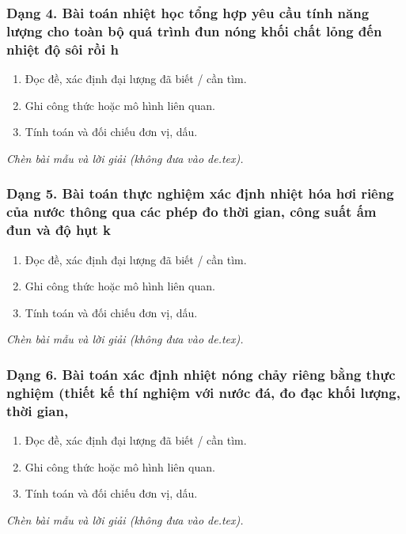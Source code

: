 \subsubsection{Dạng 4. Bài toán nhiệt học tổng hợp yêu cầu tính năng lượng cho toàn bộ quá trình đun nóng khối chất lỏng đến nhiệt độ sôi rồi h}
\begin{phuongphap}
\begin{enumerate}
\item Đọc đề, xác định đại lượng đã biết / cần tìm.
\item Ghi công thức hoặc mô hình liên quan.
\item Tính toán và đối chiếu đơn vị, dấu.
\end{enumerate}
\end{phuongphap}
\begin{vidumau}
\textit{Chèn bài mẫu và lời giải (không đưa vào de.tex).}
\end{vidumau}

\subsubsection{Dạng 5. Bài toán thực nghiệm xác định nhiệt hóa hơi riêng của nước thông qua các phép đo thời gian, công suất ấm đun và độ hụt k}
\begin{phuongphap}
\begin{enumerate}
\item Đọc đề, xác định đại lượng đã biết / cần tìm.
\item Ghi công thức hoặc mô hình liên quan.
\item Tính toán và đối chiếu đơn vị, dấu.
\end{enumerate}
\end{phuongphap}
\begin{vidumau}
\textit{Chèn bài mẫu và lời giải (không đưa vào de.tex).}
\end{vidumau}

\subsubsection{Dạng 6. Bài toán xác định nhiệt nóng chảy riêng bằng thực nghiệm (thiết kế thí nghiệm với nước đá, đo đạc khối lượng, thời gian,}
\begin{phuongphap}
\begin{enumerate}
\item Đọc đề, xác định đại lượng đã biết / cần tìm.
\item Ghi công thức hoặc mô hình liên quan.
\item Tính toán và đối chiếu đơn vị, dấu.
\end{enumerate}
\end{phuongphap}
\begin{vidumau}
\textit{Chèn bài mẫu và lời giải (không đưa vào de.tex).}
\end{vidumau}


